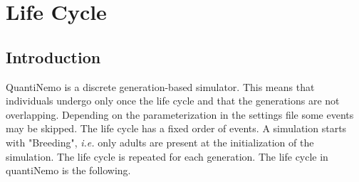 \documentclass[letterpaper,12pt,oneside]{book}
\begin{document}
\newpage
\chapter{Life Cycle}\label{chap:LifeCycle}
\section{Introduction}
QuantiNemo is a discrete generation-based simulator. This means that individuals undergo only once the life cycle and that the generations are not overlapping. Depending on the parameterization in the settings file some events may be skipped. The life cycle has a fixed order of events. A simulation starts with "Breeding", \textit{i.e.} only adults are present at the initialization of the simulation. The life cycle is repeated for each generation. The life cycle in quantiNemo is the following.  
\end{document}
